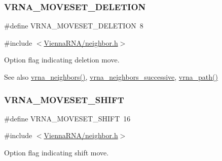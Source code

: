 \subsubsection{\texorpdfstring{V\+R\+N\+A\+\_\+\+M\+O\+V\+E\+S\+E\+T\+\_\+\+D\+E\+L\+E\+T\+I\+ON}{VRNA\_MOVESET\_DELETION}}
{\footnotesize\ttfamily \#define V\+R\+N\+A\+\_\+\+M\+O\+V\+E\+S\+E\+T\+\_\+\+D\+E\+L\+E\+T\+I\+ON~8}



{\ttfamily \#include $<$\mbox{\hyperlink{neighbor_8h}{Vienna\+R\+N\+A/neighbor.\+h}}$>$}



Option flag indicating deletion move. 

\begin{DoxySeeAlso}{See also}
\mbox{\hyperlink{group__neighbors_gab1473d856b15da2120fe648977798ad5}{vrna\+\_\+neighbors()}}, \mbox{\hyperlink{group__neighbors_gae5aaa1c5a1f22e889843f3edbdd04714}{vrna\+\_\+neighbors\+\_\+successive}}, \mbox{\hyperlink{group__paths_gab6aee4143f8b103518d5cbfe6bfe5eae}{vrna\+\_\+path()}} 
\end{DoxySeeAlso}
\mbox{\label{group__neighbors_ga68ea27c81de4b74e48b775c04052590b}} 
\subsubsection{\texorpdfstring{V\+R\+N\+A\+\_\+\+M\+O\+V\+E\+S\+E\+T\+\_\+\+S\+H\+I\+FT}{VRNA\_MOVESET\_SHIFT}}
{\footnotesize\ttfamily \#define V\+R\+N\+A\+\_\+\+M\+O\+V\+E\+S\+E\+T\+\_\+\+S\+H\+I\+FT~16}



{\ttfamily \#include $<$\mbox{\hyperlink{neighbor_8h}{Vienna\+R\+N\+A/neighbor.\+h}}$>$}



Option flag indicating shift move. 

